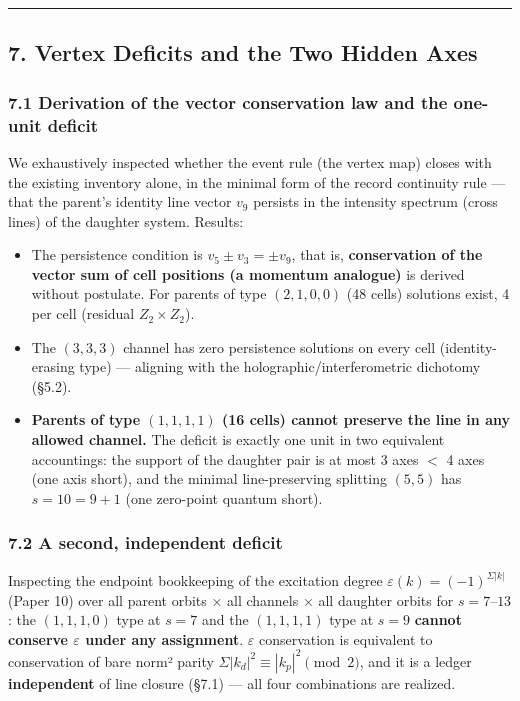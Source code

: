 \documentclass[
]{article}
\providecommand{\tightlist}{%
  \setlength{\itemsep}{0pt}\setlength{\parskip}{0pt}}
\begin{document}
\begin{center}\rule{0.5\linewidth}{0.5pt}\end{center}

\subsection{7. Vertex Deficits and the Two Hidden
Axes}\label{vertex-deficits-and-the-two-hidden-axes}

\subsubsection{7.1 Derivation of the vector conservation law and the
one-unit
deficit}\label{derivation-of-the-vector-conservation-law-and-the-one-unit-deficit}

We exhaustively inspected whether the event rule (the vertex map) closes
with the existing inventory alone, in the minimal form of the record
continuity rule --- that the parent's identity line vector \(v_9\)
persists in the intensity spectrum (cross lines) of the daughter system.
Results:

\begin{itemize}
\tightlist
\item
  The persistence condition is \(v_5\pm v_3=\pm v_9\), that is,
  \textbf{conservation of the vector sum of cell positions (a momentum
  analogue)} is derived without postulate. For parents of type
  \((2,1,0,0)\) (48 cells) solutions exist, 4 per cell (residual
  \(Z_2\times Z_2\)).
\item
  The \((3,3,3)\) channel has zero persistence solutions on every cell
  (identity-erasing type) --- aligning with the
  holographic/interferometric dichotomy (§5.2).
\item
  \textbf{Parents of type \((1,1,1,1)\) (16 cells) cannot preserve the
  line in any allowed channel.} The deficit is exactly one unit in two
  equivalent accountings: the support of the daughter pair is at most 3
  axes \(<\) 4 axes (one axis short), and the minimal line-preserving
  splitting \((5,5)\) has \(s=10=9+1\) (one zero-point quantum short).
\end{itemize}

\subsubsection{7.2 A second, independent
deficit}\label{a-second-independent-deficit}

Inspecting the endpoint bookkeeping of the excitation degree
\(\varepsilon(k)=(-1)^{\Sigma|k|}\) (Paper 10) over all parent orbits ×
all channels × all daughter orbits for \(s=7\)--\(13\): the
\((1,1,1,0)\) type at \(s=7\) and the \((1,1,1,1)\) type at \(s=9\)
\textbf{cannot conserve \(\varepsilon\) under any assignment}.
\(\varepsilon\) conservation is equivalent to conservation of bare norm²
parity \(\Sigma|k_d|^2\equiv|k_p|^2\pmod2\), and it is a ledger
\textbf{independent} of line closure (§7.1) --- all four combinations
are realized.
\end{document}
